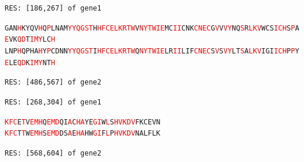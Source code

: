 \documentclass[phd,tocprelim]{cornell}
\begin{document}
\begin{flushleft}
    \singlespacing
\footnotesize
\texttt{RES: [186,267] of gene1}           

\texttt{GAN\textcolor{red}{H}KYQV\textcolor{red}{H}Q\textcolor{red}{P}LNAM\textcolor{red}{Y}\textcolor{red}{Y}\textcolor{red}{Q}\textcolor{red}{G}\textcolor{red}{S}\textcolor{red}{T}H\textcolor{red}{H}\textcolor{red}{F}\textcolor{red}{C}\textcolor{red}{E}\textcolor{red}{L}\textcolor{red}{K}\textcolor{red}{R}\textcolor{red}{T}\textcolor{red}{W}V\textcolor{red}{N}\textcolor{red}{Y}\textcolor{red}{T}\textcolor{red}{W}\textcolor{red}{I}\textcolor{red}{E}MC\textcolor{red}{I}\textcolor{red}{I}CNK\textcolor{red}{C}\textcolor{red}{N}\textcolor{red}{E}\textcolor{red}{C}G\textcolor{red}{V}V\textcolor{red}{V}\textcolor{red}{Y}NQ\textcolor{red}{S}R\textcolor{red}{L}\textcolor{red}{K}\textcolor{red}{V}WCS\textcolor{red}{I}\textcolor{red}{C}\textcolor{red}{H}S\textcolor{red}{P}A\textcolor{red}{E}VK\textcolor{red}{Q}\textcolor{red}{D}T\textcolor{red}{I}\textcolor{red}{M}\textcolor{red}{Y}LC\textcolor{red}{H}} \\         
\texttt{LNP\textcolor{red}{H}QPHA\textcolor{red}{H}Y\textcolor{red}{P}CDNN\textcolor{red}{Y}\textcolor{red}{Y}\textcolor{red}{Q}\textcolor{red}{G}\textcolor{red}{S}\textcolor{red}{T}I\textcolor{red}{H}\textcolor{red}{F}\textcolor{red}{C}\textcolor{red}{E}\textcolor{red}{L}\textcolor{red}{K}\textcolor{red}{R}\textcolor{red}{T}\textcolor{red}{W}Q\textcolor{red}{N}\textcolor{red}{Y}\textcolor{red}{T}\textcolor{red}{W}\textcolor{red}{I}\textcolor{red}{E}LR\textcolor{red}{I}\textcolor{red}{I}LIF\textcolor{red}{C}\textcolor{red}{N}\textcolor{red}{E}\textcolor{red}{C}S\textcolor{red}{V}S\textcolor{red}{V}\textcolor{red}{Y}LT\textcolor{red}{S}A\textcolor{red}{L}\textcolor{red}{K}\textcolor{red}{V}IGI\textcolor{red}{I}\textcolor{red}{C}\textcolor{red}{H}P\textcolor{red}{P}Y\textcolor{red}{E}LE\textcolor{red}{Q}\textcolor{red}{D}K\textcolor{red}{I}\textcolor{red}{M}\textcolor{red}{Y}NT\textcolor{red}{H}}

\texttt{RES: [486,567] of gene2}

\texttt{RES: [268,304] of gene1}

\texttt{\textcolor{red}{K}\textcolor{red}{F}\textcolor{red}{C}E\textcolor{red}{T}V\textcolor{red}{E}\textcolor{red}{M}\textcolor{red}{H}Q\textcolor{red}{E}\textcolor{red}{M}\textcolor{red}{D}QI\textcolor{red}{A}C\textcolor{red}{H}\textcolor{red}{A}YE\textcolor{red}{G}\textcolor{red}{I}W\textcolor{red}{L}S\textcolor{red}{H}\textcolor{red}{V}\textcolor{red}{K}\textcolor{red}{D}\textcolor{red}{V}FKCEVN} \\
\texttt{\textcolor{red}{K}\textcolor{red}{F}\textcolor{red}{C}T\textcolor{red}{T}W\textcolor{red}{E}\textcolor{red}{M}\textcolor{red}{H}S\textcolor{red}{E}\textcolor{red}{M}\textcolor{red}{D}DS\textcolor{red}{A}E\textcolor{red}{H}\textcolor{red}{A}HW\textcolor{red}{G}\textcolor{red}{I}F\textcolor{red}{L}P\textcolor{red}{H}\textcolor{red}{V}\textcolor{red}{K}\textcolor{red}{D}\textcolor{red}{V}NALFLK}

\texttt{RES: [568,604] of gene2}

\normalsize
\normalspacing
\end{flushleft}
\end{document}
